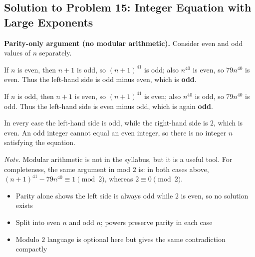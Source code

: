 \subsection{Solution to Problem 15: Integer Equation with Large Exponents}

\begin{solution}
\textbf{Parity-only argument (no modular arithmetic).} Consider even and odd values of $n$ separately.

If $n$ is even, then $n+1$ is odd, so $(n+1)^{41}$ is odd; also $n^{40}$ is even, so $79n^{40}$ is even. Thus the left-hand side is odd minus even, which is \textbf{odd}.

If $n$ is odd, then $n+1$ is even, so $(n+1)^{41}$ is even; also $n^{40}$ is odd, so $79n^{40}$ is odd. Thus the left-hand side is even minus odd, which is again \textbf{odd}.

In every case the left-hand side is odd, while the right-hand side is $2$, which is even. An odd integer cannot equal an even integer, so there is no integer $n$ satisfying the equation.

\textit{Note.} Modular arithmetic is not in the syllabus, but it is a useful tool. For completeness, the same argument in mod $2$ is: in both cases above, $(n+1)^{41} - 79n^{40} \equiv 1 \pmod{2}$, whereas $2 \equiv 0 \pmod{2}$.
\end{solution}

\begin{takeaways}
\begin{itemize}
    \item Parity alone shows the left side is always odd while $2$ is even, so no solution exists
    \item Split into even $n$ and odd $n$; powers preserve parity in each case
    \item Modulo $2$ language is optional here but gives the same contradiction compactly
\end{itemize}
\end{takeaways}

